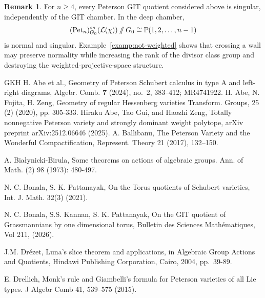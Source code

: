 \documentclass[12pt, reqno]{amsart}
\newcommand{\sslash}{\mathbin{/\mkern-6mu/}}
\theoremstyle{plain}
\numberwithin{equation}{section}
\theoremstyle{definition}
\newtheorem{remark}{Remark}
\begin{document}
\begin{remark}
For \(n\ge4\), every Peterson GIT quotient considered above is
singular, independently of the GIT chamber. In the deep chamber,
\[
(\mathrm{Pet}_n)^{ss}_{G_0}(\mathcal L(\chi))
\sslash G_0 \cong\mathbb P(1,2,\ldots,n-1)
\]
is normal and singular. Example~\ref{examp:not-weighted} shows that
crossing a wall may preserve normality while increasing the rank of
the divisor class group and destroying the weighted-projective-space
structure.
\end{remark}

\begin{thebibliography}{GKH}
H. Abe et al., Geometry of Peterson Schubert calculus in type A and left-right diagrams, Algebr. Comb. {\bf 7} (2024), no.~2, 383--412; MR4741922.
 H. Abe, N. Fujita, H. Zeng, Geometry of regular Hessenberg varieties
Transform. Groups, 25 (2) (2020), pp. 305-333. 
	 Hiraku Abe, Tao Gui, and Haozhi Zeng, Totally nonnegative Peterson variety and strongly dominant weight polytope, arXiv preprint arXiv:2512.06646 (2025).
     A. Ballibanu, The Peterson Variety and the Wonderful Compactification, Represent. Theory 21
(2017), 132–150.

 A. Białynicki-Birula,
Some theorems on actions of algebraic groups. Ann. of Math. (2) 98
(1973): 480-497. 

 N. C. Bonala, S. K. Pattanayak, On the Torus quotients of Schubert varieties,
Int. J. Math. 32(3) (2021).

 N. C. Bonala, S.S. Kannan, S. K. Pattanayak, On the GIT quotient of Grassmannians by one dimensional torus, Bulletin des Sciences Mathématiques, Vol 211, (2026).

	
 J.M. Drézet, Luna's slice theorem and applications,
in Algebraic Group Actions and Quotients,
Hindawi Publishing Corporation, Cairo, 2004, pp.~39-89.

 E. Drellich, Monk’s rule and Giambelli’s formula for Peterson varieties of all Lie types. J Algebr Comb 41, 539–575 (2015). 
    

\end{thebibliography}
\end{document}
